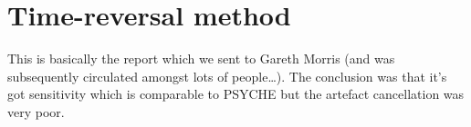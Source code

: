 \section{Time-reversal method}
\label{sec:pureshift__timerev}

This is basically the report which we sent to Gareth Morris (and was subsequently circulated amongst lots of people\ldots{}).
The conclusion was that it's got sensitivity which is comparable to PSYCHE but the artefact cancellation was very poor.
